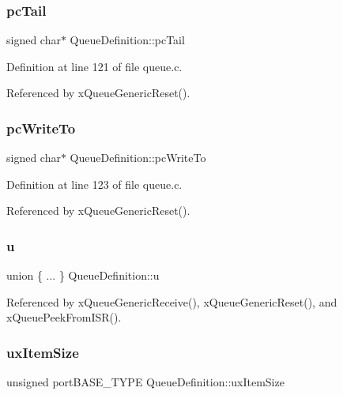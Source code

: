 \subsubsection{\texorpdfstring{pc\+Tail}{pcTail}}
{\footnotesize\ttfamily signed char$\ast$ Queue\+Definition\+::pc\+Tail}



Definition at line 121 of file queue.\+c.



Referenced by x\+Queue\+Generic\+Reset().

\mbox{\label{structQueueDefinition_a019aa270dc6be4b3d0ea3f32e6730529}} 
\subsubsection{\texorpdfstring{pc\+Write\+To}{pcWriteTo}}
{\footnotesize\ttfamily signed char$\ast$ Queue\+Definition\+::pc\+Write\+To}



Definition at line 123 of file queue.\+c.



Referenced by x\+Queue\+Generic\+Reset().

\mbox{\label{structQueueDefinition_ab2c557f3e7a58a29bd07c3c62e7e568a}} 
\subsubsection{\texorpdfstring{u}{u}}
{\footnotesize\ttfamily union \{ ... \}   Queue\+Definition\+::u}



Referenced by x\+Queue\+Generic\+Receive(), x\+Queue\+Generic\+Reset(), and x\+Queue\+Peek\+From\+I\+S\+R().

\mbox{\label{structQueueDefinition_ad8719a7d6da96299b7ed158a621ae7e5}} 
\subsubsection{\texorpdfstring{ux\+Item\+Size}{uxItemSize}}
{\footnotesize\ttfamily unsigned port\+B\+A\+S\+E\+\_\+\+T\+Y\+PE Queue\+Definition\+::ux\+Item\+Size}



